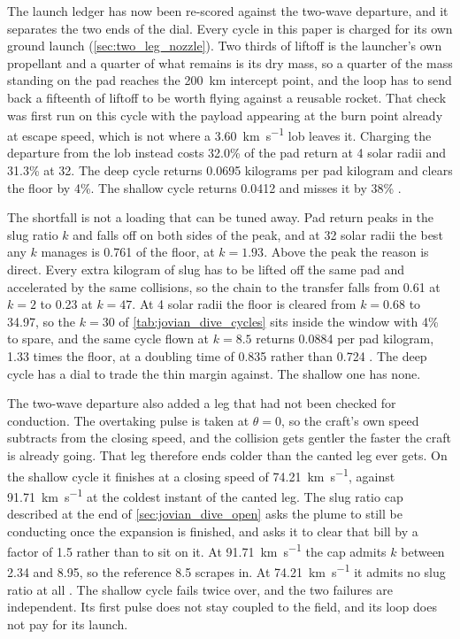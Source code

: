 \documentclass{article}
\begin{document}
The launch ledger has now been re-scored against the two-wave departure, and it separates the two ends of the dial. Every cycle in this paper is charged for its own ground launch (\autoref{sec:two_leg_nozzle}). Two thirds of liftoff is the launcher's own propellant and a quarter of what remains is its dry mass, so a quarter of the mass standing on the pad reaches the \SI{200}{\kilo\meter} intercept point, and the loop has to send back a fifteenth of liftoff to be worth flying against a reusable rocket. That check was first run on this cycle with the payload appearing at the burn point already at escape speed, which is not where a \SI{3.60}{\kilo\meter\per\second} lob leaves it. Charging the departure from the lob instead costs 32.0\% of the pad return at 4 solar radii and 31.3\% at 32. The deep cycle returns \num{0.0695} kilograms per pad kilogram and clears the floor by 4\%. The shallow cycle returns \num{0.0412} and misses it by 38\% \cite{Katz_aim_is_all_you_need_2025}.

The shortfall is not a loading that can be tuned away. Pad return peaks in the slug ratio $k$ and falls off on both sides of the peak, and at 32 solar radii the best any $k$ manages is \num{0.761} of the floor, at $k = 1.93$. Above the peak the reason is direct. Every extra kilogram of slug has to be lifted off the same pad and accelerated by the same collisions, so the chain to the transfer falls from \num{0.61} at $k = 2$ to \num{0.23} at $k = 47$. At 4 solar radii the floor is cleared from $k = 0.68$ to \num{34.97}, so the $k = 30$ of \autoref{tab:jovian_dive_cycles} sits inside the window with 4\% to spare, and the same cycle flown at $k = 8.5$ returns \num{0.0884} per pad kilogram, \num{1.33} times the floor, at a doubling time of \SI{0.835}{\year} rather than \SI{0.724}{\year} \cite{Katz_aim_is_all_you_need_2025}. The deep cycle has a dial to trade the thin margin against. The shallow one has none.

The two-wave departure also added a leg that had not been checked for conduction. The overtaking pulse is taken at $\theta = 0$, so the craft's own speed subtracts from the closing speed, and the collision gets gentler the faster the craft is already going. That leg therefore ends colder than the canted leg ever gets. On the shallow cycle it finishes at a closing speed of \SI{74.21}{\kilo\meter\per\second}, against \SI{91.71}{\kilo\meter\per\second} at the coldest instant of the canted leg. The slug ratio cap described at the end of \autoref{sec:jovian_dive_open} asks the plume to still be conducting once the expansion is finished, and asks it to clear that bill by a factor of 1.5 rather than to sit on it. At \SI{91.71}{\kilo\meter\per\second} the cap admits $k$ between \num{2.34} and \num{8.95}, so the reference \num{8.5} scrapes in. At \SI{74.21}{\kilo\meter\per\second} it admits no slug ratio at all \cite{Katz_aim_is_all_you_need_2025}. The shallow cycle fails twice over, and the two failures are independent. Its first pulse does not stay coupled to the field, and its loop does not pay for its launch.
\end{document}
